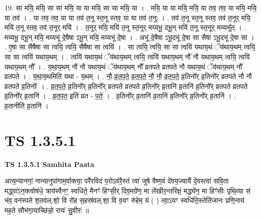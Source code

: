 \documentclass[17pt]{extarticle}
\begin{document}
19. सा मयि॒ मयि॒ सा सा मयि॒ या या मयि॒ सा सा मयि॒ या । . मयि॒ या या मयि॒ मयि॒ या तव॒ तव॒ या मयि॒ मयि॒ या तव॑ । . या तव॒ तव॒ या या तव॑ त॒नू स्त॒नू स्तव॒ या या तव॑ त॒नूः । . तव॑ त॒नू स्त॒नू स्तव॒ तव॑ त॒नूर् मयि॒ मयि॑ त॒नू स्तव॒ तव॑ त॒नूर् मयि॑ । . त॒नूर् मयि॒ मयि॑ त॒नू स्त॒नूर् मय्यभू॒ दभू॒न् मयि॑ त॒नू स्त॒नूर् मय्यभू᳚त् । . मय्यभू॒ दभू॒न् मयि॒ मय्यभू॑ दे॒षैषा ऽभू॒न् मयि॒ मय्यभू॑ दे॒षा । . अभू॑ दे॒षैषा ऽभू॒दभू॑ दे॒षा सा सैषा ऽभू॒दभू॑ दे॒षा सा । . ए॒षा सा सैषैषा सा त्वयि॒ त्वयि॒ सैषैषा सा त्वयि॑ । . सा त्वयि॒ त्वयि॒ सा सा त्वयि॑ यथाय॒थं ॅय॑थाय॒थम् त्वयि॒ सा सा त्वयि॑ यथाय॒थम् । . त्वयि॑ यथाय॒थं ॅय॑थाय॒थम् त्वयि॒ त्वयि॑ यथाय॒थम् नौ॑ नौ यथाय॒थम् त्वयि॒ त्वयि॑ यथाय॒थम् नौ᳚ । . य॒था॒य॒थम् नौ॑ नौ यथाय॒थं ॅय॑थाय॒थम् नौ᳚ व्रतपते व्रतपते नौ यथाय॒थं ॅय॑थाय॒थम् नौ᳚ व्रतपते । . य॒था॒य॒थमिति॑ यथा - य॒थम् । . नौ॒ व्र॒त॒प॒ते॒ व्र॒त॒प॒ते॒ नौ॒ नौ॒ व्र॒त॒प॒ते॒ व्र॒तिनो᳚र् व्र॒तिनो᳚र् व्रतपते नौ नौ व्रतपते व्र॒तिनोः᳚ । . व्र॒त॒प॒ते॒ व्र॒तिनो᳚र् व्र॒तिनो᳚र् व्रतपते व्रतपते व्र॒तिनो᳚र् व्र॒तानि॑ व्र॒तानि॑ व्र॒तिनो᳚र् व्रतपते व्रतपते व्र॒तिनो᳚र् व्र॒तानि॑ । . व्र॒त॒प॒त॒ इति॑ व्रत - प॒ते॒ । . व्र॒तिनो᳚र् व्र॒तानि॑ व्र॒तानि॑ व्र॒तिनो᳚र् व्र॒तिनो᳚र् व्र॒तानि॑ । . व्र॒तानीति॑ व्र॒तानि॑ । \newline
\pagebreak
{}
\section*{ TS 1.3.5.1 }

\textbf{TS 1.3.5.1 } \newline
\textbf{Samhita Paata} \newline

अत्य॒न्यानगां॒ नान्यानुपा॑गाम॒र्वाक्त्वा॒ परै॑रविदं प॒रोऽव॑रै॒स्तं त्वा॑ जुषे वैष्ण॒वं दे॑वय॒ज्यायै॑ दे॒वस्त्वा॑ सवि॒ता मद्ध्वा॑ऽन॒क्त्वोष॑धे॒ त्राय॑स्वैनꣳ॒॒ स्वधि॑ते॒ मैनꣳ॑ हिꣳसी॒र् दिव॒मग्रे॑ण॒ मा ले॑खीर॒न्तरि॑क्षं॒ मद्ध्ये॑न॒ मा हिꣳ॑सीः पृथि॒व्या सं भ॑व॒ वन॑स्पते श॒तव॑ल्.शो॒ वि रो॑ह स॒हस्र॑वल्.शा॒ वि व॒यꣳ रु॑हेम॒ यं ( ) त्वा॒ऽयꣳ स्वधि॑ति॒स्तेति॑जानः प्रणि॒नाय॑ मह॒ते सौभ॑गा॒याच्छि॑न्नो॒ रायः॑ सु॒वीरः॑ ॥ \newline
\end{document}
